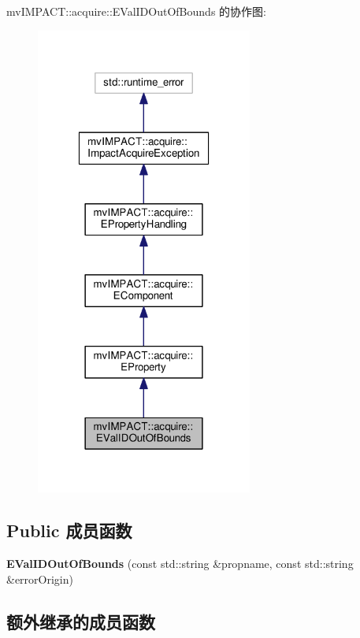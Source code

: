 mv\+I\+M\+P\+A\+C\+T\+:\+:acquire\+:\+:E\+Val\+I\+D\+Out\+Of\+Bounds 的协作图\+:
\nopagebreak
\begin{figure}[H]
\begin{center}
\leavevmode
\includegraphics[width=202pt]{classmv_i_m_p_a_c_t_1_1acquire_1_1_e_val_i_d_out_of_bounds__coll__graph}
\end{center}
\end{figure}
\subsection*{Public 成员函数}
\begin{DoxyCompactItemize}
\item 
\hypertarget{classmv_i_m_p_a_c_t_1_1acquire_1_1_e_val_i_d_out_of_bounds_a95f840572716b234b8630408dbf5f48c}{{\bfseries E\+Val\+I\+D\+Out\+Of\+Bounds} (const std\+::string \&propname, const std\+::string \&error\+Origin)}\label{classmv_i_m_p_a_c_t_1_1acquire_1_1_e_val_i_d_out_of_bounds_a95f840572716b234b8630408dbf5f48c}

\end{DoxyCompactItemize}
\subsection*{额外继承的成员函数}


